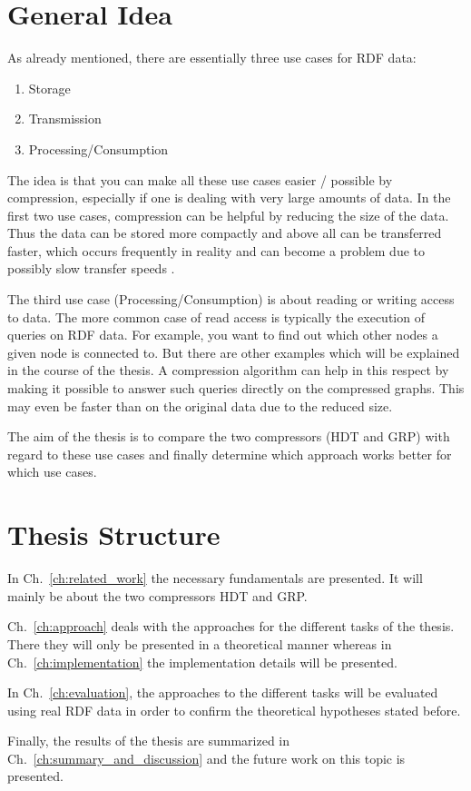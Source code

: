 \section{General Idea}

As already mentioned, there are essentially three use cases for RDF data:

\begin{enumerate}
	\item Storage
	\item Transmission
	\item Processing/Consumption
\end{enumerate}

The idea is that you can make all these use cases easier / possible by compression, especially if one is dealing with very large amounts of data. In the first two use cases, compression can be helpful by reducing the size of the data. Thus the data can be stored more compactly and above all can be transferred faster, which occurs frequently in reality and can become a problem due to possibly slow transfer speeds .

The third use case (Processing/Consumption) is about reading or writing access to data. The more common case of read access is typically the execution of queries on RDF data. For example, you want to find out which other nodes a given node is connected to. But there are other examples which will be explained in the course of the thesis. A compression algorithm can help in this respect by making it possible to answer such queries directly on the compressed graphs. This may even be faster than on the original data due to the reduced size.

The aim of the thesis is to compare the two compressors (HDT and GRP) with regard to these use cases and finally determine which approach works better for which use cases.



\section{Thesis Structure}

In Ch.~\ref{ch:related_work} the necessary fundamentals are presented. It will mainly be about the two compressors HDT and GRP. 

Ch.~\ref{ch:approach} deals with the approaches for the different tasks of the thesis. There they will only be presented in a theoretical manner whereas in Ch.~\ref{ch:implementation} the implementation details will be presented.

In Ch.~\ref{ch:evaluation}, the approaches to the different tasks will be evaluated using real RDF data in order to confirm the theoretical hypotheses stated before.

Finally, the results of the thesis are summarized in Ch.~\ref{ch:summary_and_discussion} and the future work on this topic is presented.








